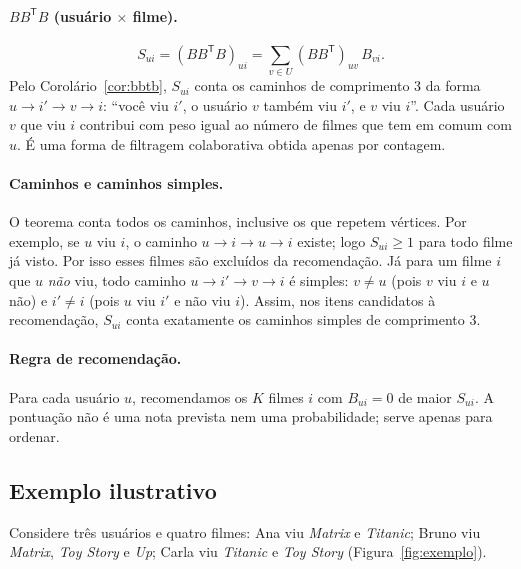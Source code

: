 \documentclass[12pt,a4paper]{article}
\theoremstyle{definition}
\begin{document}
\paragraph{$BB^{\mathsf T}B$ (usuário $\times$ filme).}
\[
  S_{ui} = (BB^{\mathsf T}B)_{ui} = \sum_{v \in U} (BB^{\mathsf T})_{uv}\, B_{vi}.
\]
Pelo Corolário~\ref{cor:bbtb}, $S_{ui}$ conta os caminhos de comprimento 3 da forma
$u \to i' \to v \to i$: ``você viu $i'$, o usuário $v$ também viu $i'$, e $v$
viu $i$''. Cada usuário $v$ que viu $i$ contribui com peso igual ao número de
filmes que tem em comum com $u$. É uma forma de filtragem colaborativa obtida
apenas por contagem.


\paragraph{Caminhos e caminhos simples.}
O teorema conta todos os caminhos, inclusive os que repetem vértices. Por
exemplo, se $u$ viu $i$, o caminho $u \to i \to u \to i$ existe; logo
$S_{ui} \geq 1$ para todo filme já visto. Por isso esses filmes são excluídos
da recomendação. Já para um filme $i$ que $u$ \emph{não} viu, todo caminho
$u \to i' \to v \to i$ é simples: $v \neq u$ (pois $v$ viu $i$ e $u$ não) e
$i' \neq i$ (pois $u$ viu $i'$ e não viu $i$). Assim, nos itens candidatos à
recomendação, $S_{ui}$ conta exatamente os caminhos simples de comprimento 3.

\paragraph{Regra de recomendação.}
Para cada usuário $u$, recomendamos os $K$ filmes $i$ com $B_{ui} = 0$ de maior
$S_{ui}$. A pontuação não é uma nota prevista nem uma probabilidade; serve
apenas para ordenar.

\subsection{Exemplo ilustrativo}\label{sec:exemplo}

Considere três usuários e quatro filmes: Ana viu \emph{Matrix} e
\emph{Titanic}; Bruno viu \emph{Matrix}, \emph{Toy Story} e \emph{Up}; Carla
viu \emph{Titanic} e \emph{Toy Story} (Figura~\ref{fig:exemplo}).
\end{document}
